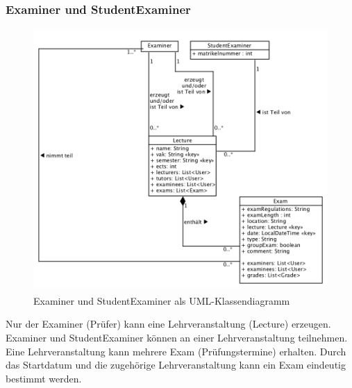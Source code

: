 \subsubsection{Examiner und StudentExaminer}
\begin{figure}[H]
	\centering
  \includegraphics[width=\textwidth,height=10cm,keepaspectratio]{../UMLDiagramme/datenmodell/examiner.png}
	\caption{Examiner und StudentExaminer als UML-Klassendiagramm}
	\label{fig 2}
\end{figure}
Nur der Examiner (Prüfer) kann eine Lehrveranstaltung (Lecture) erzeugen. 
Examiner und StudentExaminer können an einer Lehrveranstaltung teilnehmen.
Eine Lehrveranstaltung kann mehrere Exam (Prüfungstermine) erhalten.
Durch das Startdatum und die zugehörige Lehrveranstaltung kann ein Exam eindeutig bestimmt werden.


